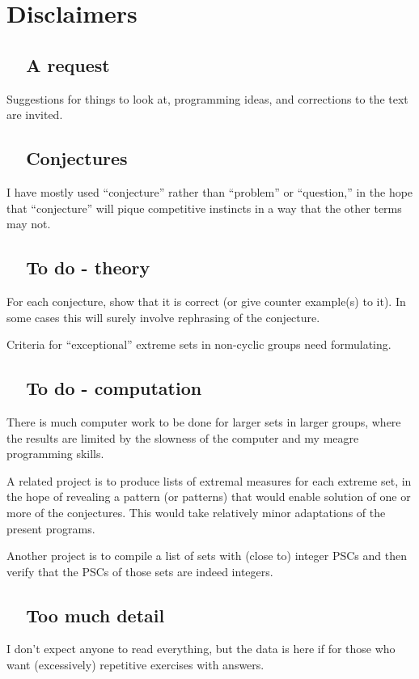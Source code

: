 \section{Disclaimers} 
{\Small
\subsection*{\ \ A request}  Suggestions for things to look at, programming ideas, and  corrections to the text are invited.



\subsection*{\ \  Conjectures} I have mostly used ``conjecture'' rather than ``problem'' or ``question,'' in the hope
that ``conjecture'' will pique competitive instincts in a way that the other terms may not. 

\subsection*{\ \ To do - theory}
For  each   conjecture, show that it is correct (or give counter example(s) to it). In some cases this will
surely involve rephrasing of the conjecture.
\smallbreak

Criteria for ``exceptional'' extreme sets in non-cyclic groups need formulating. 

\subsection*{\ \ To do - computation} 
There is much computer work to be done for larger sets in larger  
groups, where the results are limited by the slowness of the computer and my
meagre programming skills.  

 
\smallbreak
 A related project is to produce lists of extremal measures for each extreme set, in the hope of revealing  a
pattern (or patterns) that would enable solution of one or more of the conjectures. 
This would take relatively minor adaptations of the present programs.

\smallbreak
 Another project is to compile a list of sets with (close to) integer PSCs and then verify that the PSCs of
those sets are indeed integers.

\subsection*{\ \ Too much detail}
I don't expect anyone to read everything, 
  but the data is here if for those who want (excessively) repetitive exercises with answers.
  
}
